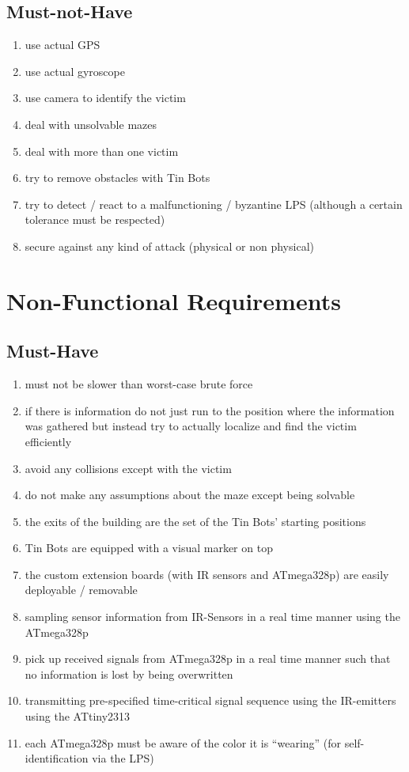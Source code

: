 \documentclass[a4paper,parskip,headheight=38pt]{scrartcl} %
\begin{document}
\subsection{Must-not-Have}
\begin{enumerate}[label=\mustnothave]
\item use actual GPS
\item use actual gyroscope
\item use camera to identify the victim
\item deal with unsolvable mazes
\item deal with more than one victim
\item try to remove obstacles with Tin Bots
\item try to detect / react to a malfunctioning / byzantine LPS (although a certain tolerance must be respected)
\item secure against any kind of attack (physical or non physical)
\end{enumerate}

\section{Non-Functional Requirements}
\subsection{Must-Have}
\begin{enumerate}[label=\musthave]
\item must not be slower than worst-case brute force
\item if there is information do not just run to the position where the information was gathered but instead try to actually localize and find the victim efficiently
\item avoid any collisions except with the victim
\item do not make any assumptions about the maze except being solvable
\item the exits of the building are the set of the Tin Bots' starting positions
\item Tin Bots are equipped with a visual marker on top
\item the custom extension boards (with IR sensors and ATmega328p) are easily deployable / removable
\item sampling sensor information from IR-Sensors in a real time manner using the ATmega328p
\item pick up received signals from ATmega328p in a real time manner such that no information is lost by being overwritten
\item transmitting pre-specified time-critical signal sequence using the IR-emitters using the ATtiny2313
\item each ATmega328p must be aware of the color it is \enquote{wearing} (for self-identification via the LPS)
\end{enumerate}
\end{document}
